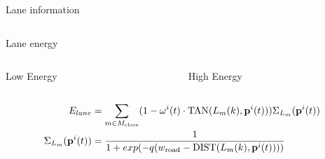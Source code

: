 \begin{frame}{Lane information}
\begin{columns}[c]
\begin{column}{0.5\textwidth}
    \end{column}
  \end{columns}

\end{frame}

\newcommand{\carbev}{
  \coordinate (ra) at (1,0.2);
  \coordinate (rb) at (2,0.7);
  \draw [thick,blue] (ra) rectangle (rb);
  \draw [thick,black] let \p1 = (ra), \p2 = (rb) in ($.5*(\x1, \y2) + .5*(\x1, \y1) + (-0.2,0)$) -- ($.5*(ra)+.5*(rb)$);
}
\begin{frame}{Lane energy}
      \centering
  \begin{columns}
    \begin{column}[t]{0.5\textwidth}
      \centering
      Low Energy

    \end{column}
    \begin{column}[t]{0.5\textwidth}
      \centering
      High Energy

    \end{column}
  \end{columns}
  \begin{align}
    \label{eq:laneOrientationEnergy}
    E_{lane} &= 
    \sum_{m \in M_{\text{close}}}
    (1 - \mathbf{\omega}^{i}(t) \cdot \text{TAN}(L_{m}(k), \mathbf{p}^{i}({t})) )
    \Sigma_{L_m}(\mathbf{p}^{i}({t}))
    \\
    \Sigma_{L_m}(\mathbf{p}^{i}({t})) &=
    \frac{1}{1 + exp(-q(w_{\text{road}} - \text{DIST}(L_{m}(k), \mathbf{p}^{i}({t}))))}
  \end{align}
    
\end{frame}

